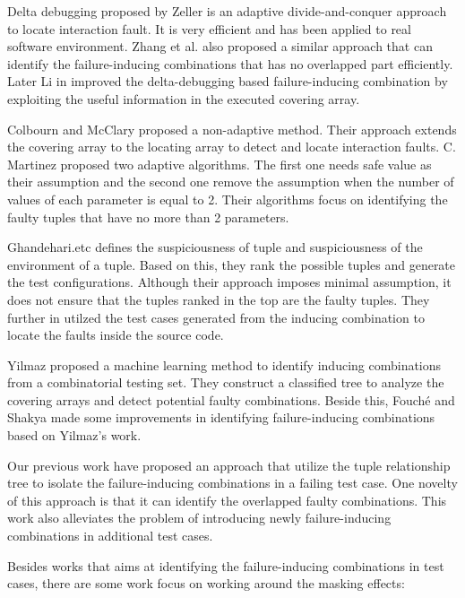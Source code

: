 \documentclass{sig-alternate}
\begin{document}
Delta debugging \cite{zeller2002simplifying} proposed by Zeller is an adaptive divide-and-conquer approach to locate interaction fault. It is very efficient and has been applied to real software environment. Zhang et al. \cite{zhang2011characterizing} also proposed a similar approach that can identify the failure-inducing combinations that has no overlapped part efficiently. Later Li in \cite{li2012improved} improved the delta-debugging based failure-inducing combination by exploiting the useful information in the executed covering array.

Colbourn and McClary \cite{colbourn2008locating} proposed a non-adaptive method. Their approach extends the covering array to the locating array to detect and locate interaction faults. C. Martinez \cite{martinez2008algorithms,martinez2009locating} proposed two adaptive algorithms. The first one needs safe value as their assumption and the second one remove the assumption when the number of values of each parameter is equal to 2. Their algorithms focus on identifying the faulty tuples that have no more than 2 parameters.

Ghandehari.etc \cite{ghandehari2012identifying} defines the suspiciousness of tuple and suspiciousness of the environment of a tuple. Based on this, they rank the possible tuples and generate the test configurations. Although their approach imposes minimal assumption, it does not ensure that the tuples ranked in the top are the faulty tuples. They further in \cite{ghandehari2013fault} utilzed the test cases generated from the inducing combination to locate the faults inside the source code.


Yilmaz \cite{yilmaz2006covering} proposed a machine learning method to identify inducing combinations from a combinatorial testing set. They construct a classified tree to analyze the covering arrays and detect potential faulty combinations. Beside this, Fouché \cite{fouche2009incremental} and Shakya \cite{shakya2012isolating} made some improvements in identifying failure-inducing combinations based on Yilmaz's work.

Our previous work \cite{niu2013identifying} have proposed an approach that utilize the tuple relationship tree to isolate the failure-inducing combinations in a failing test case. One novelty of this approach is that it can identify the overlapped faulty combinations. This work also alleviates the problem of introducing newly failure-inducing combinations in additional test cases.

Besides works that aims at identifying the failure-inducing combinations in test cases, there are some work focus on working around the masking effects:
\end{document}

